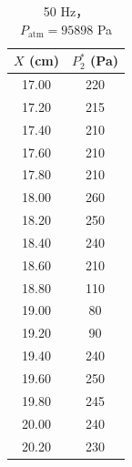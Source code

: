 \begin{table}[H]
  \centering
  \caption[50 Hz 尾迹扫描数据]{50 Hz，$P_{\text{atm}}=95898$ Pa}
  \label{tab:exp6_50_Hz}
  \renewcommand{\arraystretch}{1.2}
  \begin{tabular}{cc}
    \toprule
    $X$ (cm) & $P_2^*$ (Pa) \\
    \midrule
    17.00 & 220 \\
    17.20 & 215 \\
    17.40 & 210 \\
    17.60 & 210 \\
    17.80 & 210 \\
    18.00 & 260 \\
    18.20 & 250 \\
    18.40 & 240 \\
    18.60 & 210 \\
    18.80 & 110 \\
    19.00 & 80 \\
    19.20 & 90 \\
    19.40 & 240 \\
    19.60 & 250 \\
    19.80 & 245 \\
    20.00 & 240 \\
    20.20 & 230 \\
    \bottomrule
  \end{tabular}
\end{table}